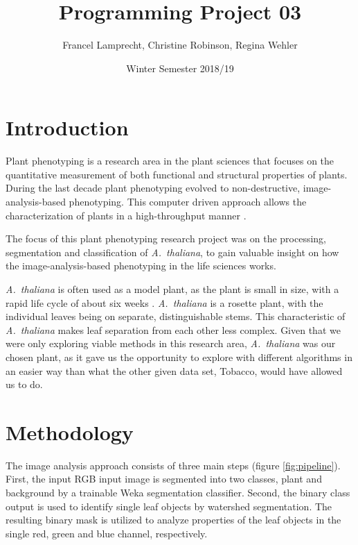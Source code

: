 \documentclass[paper=A4,bibliography=totocnumbered]{scrartcl}
\title{Programming Project 03}
\author{Francel Lamprecht, Christine Robinson, Regina Wehler}
\date{Winter Semester 2018/19}
\begin{document}
\maketitle

\tableofcontents
\clearpage
\section{Introduction}
Plant phenotyping is a research  area in the plant sciences that focuses on the quantitative measurement of both functional and structural properties of plants. During the last decade plant phenotyping evolved to non-destructive, image-analysis-based phenotyping. This computer driven approach allows the characterization of plants in a high-throughput manner \citep{Walter.2015}.

The focus of this plant phenotyping research project was on the processing, segmentation and classification of \textit{A.~thaliana}, to gain valuable insight on how the image-analysis-based phenotyping in the life sciences works. 

\textit{A.~thaliana} is often used as a model plant, as the plant is small in size, with a rapid life cycle of about six weeks \citep{Koornneef.2010}. \textit{A.~thaliana} is a rosette plant, with the individual leaves being on separate, distinguishable stems. This characteristic of \textit{A.~thaliana} makes leaf separation from each other less complex.  Given that we were only exploring viable methods in this research area, \textit{A.~thaliana} was our chosen plant, as it gave us the opportunity to explore with different algorithms in an easier way than what the other given data set, Tobacco, would have allowed us to do. 



\section{Methodology}
The image analysis approach consists of three main steps (figure \ref{fig:pipeline}). First, the input RGB input image is segmented into two classes, plant and background by a trainable Weka segmentation classifier. Second, the binary class output is used to identify single leaf objects by watershed segmentation. The resulting binary mask is utilized to analyze properties of the leaf objects in the single red, green and blue channel, respectively.
\end{document}
